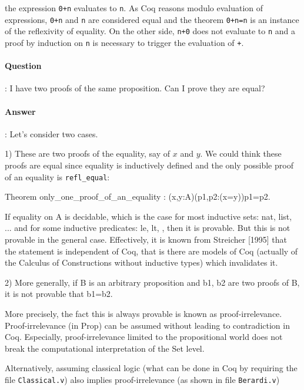 \documentclass{article}
\newcommand{\coqtt}[1]{{\tt #1}}
\begin{document}
the expression \coqtt{0+n} evaluates to \coqtt{n}. As Coq reasons
modulo evaluation of expressions, \coqtt{0+n} and \coqtt{n} are
considered equal and the theorem \coqtt{0+n=n} is an instance of the
reflexivity of equality. On the other side, \coqtt{n+0} does not
evaluate to \coqtt{n} and a proof by induction on \coqtt{n} is
necessary to trigger the evaluation of \coqtt{+}.

\paragraph{Question}: I have two proofs of the same proposition. Can I prove they are equal?

\paragraph{Answer}: Let's consider two cases.

  1) These are two proofs of the equality, say of $x$ and $y$. We could
  think these proofs are equal since equality is inductively defined
  and the only possible proof of an equality is \verb=refl_equal=:

\begin{coq_example*}
Theorem only_one_proof_of_an_equality : (x,y:A)(p1,p2:(x=y))p1=p2.
\end{coq_example*}

  If equality on A is decidable, which is the case for most inductive
  sets: nat, list, ... and for some inductive predicates: le, lt, ,
  then it is provable. But this is not provable in the general
  case. Effectively, it is known from Streicher [1995] that the
  statement is independent of Coq, that is there are models of Coq
  (actually of the Calculus of Constructions without inductive types)
  which invalidates it.

  2) More generally, if B is an arbitrary proposition and b1, b2 are
  two proofs of B, it is not provable that b1=b2.

  More precisely, the fact this is always provable is known as
  proof-irrelevance. Proof-irrelevance (in Prop) can be assumed
  without leading to contradiction in Coq. Especially,
  proof-irrelevance limited to the propositional world does not break
  the computational interpretation of the Set level.

  Alternatively, assuming classical logic (what can be done in Coq
  by requiring the file \verb=Classical.v=) also implies
  proof-irrelevance (as shown in file \verb=Berardi.v=)
\end{document}
